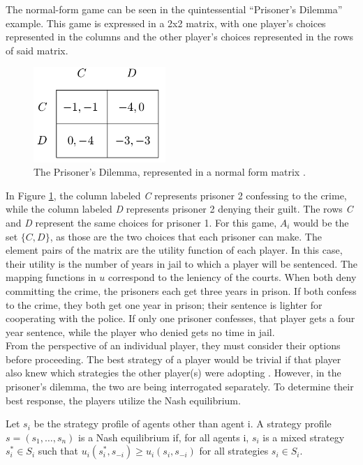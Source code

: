 The normal-form game can be seen in the quintessential ``Prisoner's Dilemma'' example. This game is expressed in a 2x2 matrix, with one player's choices represented in the columns and the other player's choices represented in the rows of said matrix.

\begin{figure}[h]
  \centering
  \includegraphics[width=5cm]{figures/ExampleGrid.png}
  \caption{The Prisoner's Dilemma, represented in a normal form matrix \cite{shoh09}.}
  \label{fig:prisoner}
\end{figure}

In Figure \ref{fig:prisoner}, the column labeled \textit{C} represents prisoner 2 confessing to the crime, while the column labeled \textit{D} represents prisoner 2 denying their guilt. The rows \textit{C} and \textit{D} represent the same choices for prisoner 1. For this game, $A_i$ would be the set $\{C, D\}$, as those are the two choices that each prisoner can make. The element pairs of the matrix are the utility function of each player. In this case, their utility is the number of years in jail to which a player will be sentenced. The mapping functions in $u$ correspond to the leniency of the courts. When both deny committing the crime, the prisoners each get three years in prison. If both confess to the crime, they both get one year in prison; their sentence is lighter for cooperating with the police. If only one prisoner confesses, that player gets a four year sentence, while the player who denied gets no time in jail.\\

From the perspective of an individual player, they must consider their options before proceeding. The best strategy of a player would be trivial if that player also knew which strategies the other player(s) were adopting \cite{shoh09}. However, in the prisoner's dilemma, the two are being interrogated separately. To determine their best response, the players utilize the Nash equilibrium.

\begin{define}
  Let $s_i$ be the strategy profile of agents other than agent i. A strategy profile $s=(s_1,\dots ,s_n)$ is a Nash equilibrium if, for all agents i, $s_i$ is a mixed strategy $s^*_i\in S_i$ such that $u_i(s^*_i, s_{-i}) \ge u_i(s_i, s_{-i})$ for all strategies $s_i\in S_i$.
\end{define}

